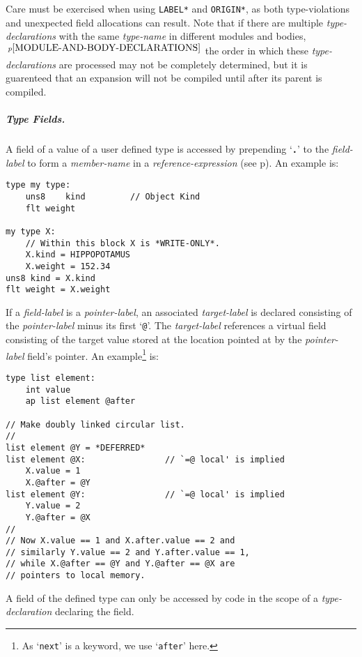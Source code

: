 \documentclass[12pt]{article}
\newcommand{\subsubsubsubsection}[1]{\subparagraph[#1]{#1.}}
\newcommand{\TT}[1]{{\tt \bfseries #1}}
\newcommand{\pagref}[1]{p\pageref{#1}}
\newcommand{\pagnote}[1]{$\,^{p\pageref{#1}}$}
\newenvironment{indpar}[1][0.3in]%
	{\begin{list}{}%
		     {\setlength{\itemsep}{0in}%
		      \setlength{\topsep}{0in}%
		      \setlength{\parsep}{1ex}%
		      \setlength{\labelwidth}{#1}%
		      \setlength{\leftmargin}{#1}%
		      \addtolength{\leftmargin}{\labelsep}}%
	 \item}%
	{\end{list}}
\begin{document}
Care must be exercised when using {\tt *LABEL*} and {\tt *ORIGIN*},
as both type-violations and unexpected field allocations can result.
Note that if there are multiple {\em type-declarations}
with the same {\em type-name} in different
modules and bodies,\pagnote{MODULE-AND-BODY-DECLARATIONS}
the order in which these {\em type-declarations} are processed
may not be completely determined, but it is guarenteed that
an expansion will not be compiled until after its parent is compiled.

\subsubsubsubsection{Type Fields}

A field of a value of a user defined type is accessed by prepending
`\TT{.}' to the {\em field-label} to form a {\em member-name} in
a {\em reference-expression} (see \pagref{FIELD-SELECTION}).
An example is:

\begin{indpar}\begin{verbatim}
type my type:
    uns8    kind         // Object Kind
    flt weight

my type X:
    // Within this block X is *WRITE-ONLY*.
    X.kind = HIPPOPOTAMUS
    X.weight = 152.34
uns8 kind = X.kind
flt weight = X.weight
\end{verbatim}\end{indpar}

If a {\em field-label} is a {\em pointer-label}, an
associated {\em target-label} is declared consisting of the
{\em pointer-label} minus its first `{\tt @}'.  The {\em target-label}
references a virtual field consisting of the target value stored
at the location pointed at by the {\em pointer-label} field's pointer.
An example\footnote{As `{\tt next}' is a keyword, we use `{\tt after}'
here.} is:

\begin{indpar}\begin{verbatim}
type list element:
    int value
    ap list element @after

// Make doubly linked circular list.
//
list element @Y = *DEFERRED*
list element @X:                // `=@ local' is implied
    X.value = 1
    X.@after = @Y
list element @Y:                // `=@ local' is implied
    Y.value = 2
    Y.@after = @X
//
// Now X.value == 1 and X.after.value == 2 and
// similarly Y.value == 2 and Y.after.value == 1,
// while X.@after == @Y and Y.@after == @X are
// pointers to local memory.
\end{verbatim}\end{indpar}

A field of
the defined type can only be accessed by code in the scope
of a {\em type-declaration} declaring the field.
\end{document}
